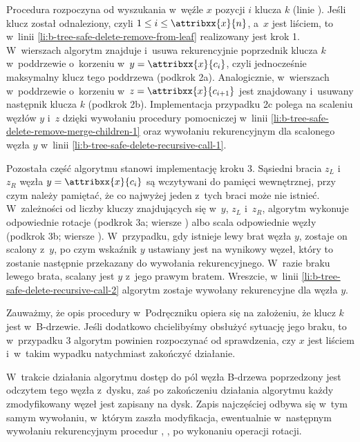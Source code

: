 Procedura rozpoczyna od wyszukania w~węźle $x$ pozycji $i$ klucza $k$ (linie \doubledash{\ref{li:b-tree-safe-delete-search-begin}}{\ref{li:b-tree-safe-delete-search-end}}).
Jeśli klucz został odnaleziony, czyli $1\le i\le\attribxx{x}{n}$, a~$x$ jest liściem, to w~linii \ref{li:b-tree-safe-delete-remove-from-leaf} realizowany jest krok 1.
W~wierszach \doubledash{\ref{li:b-tree-safe-delete-remove-predecessor-begin}}{\ref{li:b-tree-safe-delete-remove-predecessor-end}} algorytm znajduje i~usuwa rekurencyjnie poprzednik klucza $k$ w~poddrzewie o~korzeniu w~$y=\attribxx{x}{c_i}$, czyli jednocześnie maksymalny klucz tego poddrzewa (podkrok 2a).
Analogicznie, w~wierszach \doubledash{\ref{li:b-tree-safe-delete-remove-successor-begin}}{\ref{li:b-tree-safe-delete-remove-successor-end}} w~poddrzewie o~korzeniu w~$z=\attribxx{x}{c_{i+1}}$ jest znajdowany i~usuwany następnik klucza $k$ (podkrok 2b).
Implementacja przypadku 2c polega na scaleniu węzłów $y$ i~$z$ dzięki wywołaniu procedury pomocniczej w~linii \ref{li:b-tree-safe-delete-remove-merge-children-1} oraz wywołaniu rekurencyjnym dla scalonego węzła $y$ w~linii \ref{li:b-tree-safe-delete-recursive-call-1}.

Pozostała część algorytmu stanowi implementację kroku 3.
Sąsiedni bracia $z_L$ i~$z_R$ węzła $y=\attribxx{x}{c_i}$ są wczytywani do pamięci wewnętrznej, przy czym należy pamiętać, że co najwyżej jeden z~tych braci może nie istnieć.
W~zależności od liczby kluczy znajdujących się w~$y$, $z_L$ i~$z_R$, algorytm wykonuje odpowiednie rotacje (podkrok 3a; wiersze \doubledash{\ref{li:b-tree-safe-delete-rotations-begin}}{\ref{li:b-tree-safe-delete-rotations-end}}) albo scala odpowiednie węzły (podkrok 3b; wiersze \doubledash{\ref{li:b-tree-safe-delete-remove-mergers-begin}}{\ref{li:b-tree-safe-delete-remove-mergers-end}}).
W~przypadku, gdy istnieje lewy brat węzła $y$, zostaje on scalony z~$y$, po czym wskaźnik $y$ ustawiany jest na wynikowy węzeł, który to zostanie następnie przekazany do wywołania rekurencyjnego.
W~razie braku lewego brata, scalany jest $y$ z~jego prawym bratem.
Wreszcie, w~linii \ref{li:b-tree-safe-delete-recursive-call-2} algorytm zostaje wywołany rekurencyjne dla węzła $y$.

Zauważmy, że opis procedury w~Podręczniku opiera się na założeniu, że klucz $k$ jest w~B-drzewie.
Jeśli dodatkowo chcielibyśmy obsłużyć sytuację jego braku, to w~przypadku 3 algorytm powinien rozpoczynać od sprawdzenia, czy $x$ jest liściem i~w~takim wypadku natychmiast zakończyć działanie.

W~trakcie działania algorytmu dostęp do pól węzła B-drzewa poprzedzony jest odczytem tego węzła z~dysku, zaś po zakończeniu działania algorytmu każdy zmodyfikowany węzeł jest zapisany na dysk.
Zapis najczęściej odbywa się w~tym samym wywołaniu, w~którym zaszła modyfikacja, ewentualnie w~następnym wywołaniu rekurencyjnym procedur , ,  po wykonaniu operacji rotacji.


